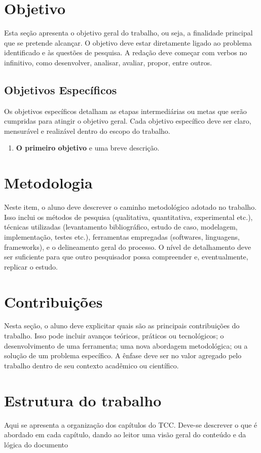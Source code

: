 \section{Objetivo}
Esta seção apresenta o objetivo geral do trabalho, ou seja, a finalidade principal que se pretende alcançar. O objetivo deve estar diretamente ligado ao problema identificado e às questões de pesquisa. A redação deve começar com verbos no infinitivo, como desenvolver, analisar, avaliar, propor, entre outros.

\subsection{Objetivos Específicos}
Os objetivos específicos detalham as etapas intermediárias ou metas que serão cumpridas para atingir o objetivo geral. Cada objetivo específico deve ser claro, mensurável e realizável dentro do escopo do trabalho.

\begin{enumerate}
    \item \textbf{O primeiro objetivo} e uma breve descrição.
\end{enumerate}

\section{Metodologia}
Neste item, o aluno deve descrever o caminho metodológico adotado no trabalho. Isso inclui os métodos de pesquisa (qualitativa, quantitativa, experimental etc.), técnicas utilizadas (levantamento bibliográfico, estudo de caso, modelagem, implementação, testes etc.), ferramentas empregadas (softwares, linguagens, frameworks), e o delineamento geral do processo. O nível de detalhamento deve ser suficiente para que outro pesquisador possa compreender e, eventualmente, replicar o estudo.

\section{Contribuições}
Nesta seção, o aluno deve explicitar quais são as principais contribuições do trabalho. Isso pode incluir avanços teóricos, práticos ou tecnológicos; o desenvolvimento de uma ferramenta; uma nova abordagem metodológica; ou a solução de um problema específico. A ênfase deve ser no valor agregado pelo trabalho dentro de seu contexto acadêmico ou científico.

\section{Estrutura do trabalho}
Aqui se apresenta a organização dos capítulos do TCC. Deve-se descrever o que é abordado em cada capítulo, dando ao leitor uma visão geral do conteúdo e da lógica do documento